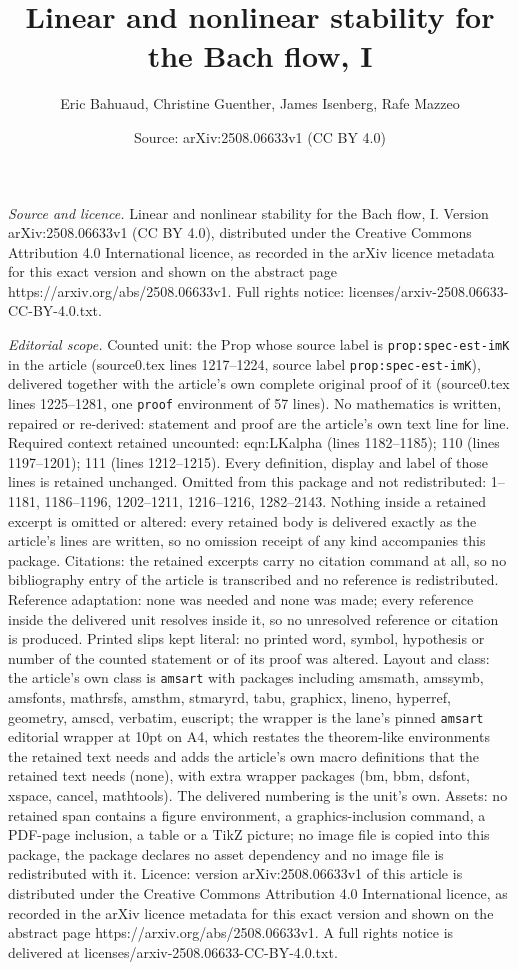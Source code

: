 \documentclass[10pt,a4paper]{amsart}
\title[Linear and nonlinear stability for the Bach flow, I]{Linear and nonlinear stability for the Bach flow, I}
\author{Eric Bahuaud, Christine Guenther, James Isenberg, Rafe Mazzeo}
\date{Source: arXiv:2508.06633v1 (CC BY 4.0)}
\begin{document}
\maketitle

\noindent\emph{Source and licence.} Linear and nonlinear stability for the Bach flow, I. Version arXiv:2508.06633v1 (CC BY 4.0), distributed under the Creative Commons Attribution 4.0 International licence, as recorded in the arXiv licence metadata for this exact version and shown on the abstract page https://arxiv.org/abs/2508.06633v1. Full rights notice: licenses/arxiv-2508.06633-CC-BY-4.0.txt.\par\smallskip

\noindent\textit{Editorial scope.} Counted unit: the Prop whose source label is \texttt{prop:spec-est-imK} in the article (source0.tex lines 1217--1224, source label \texttt{prop:spec-est-imK}), delivered together with the article's own complete original proof of it (source0.tex lines 1225--1281, one \texttt{proof} environment of 57 lines). No mathematics is written, repaired or re-derived: statement and proof are the article's own text line for line. Required context retained uncounted: eqn:LKalpha (lines 1182--1185); 110 (lines 1197--1201); 111 (lines 1212--1215). Every definition, display and label of those lines is retained unchanged. Omitted from this package and not redistributed: 1--1181, 1186--1196, 1202--1211, 1216--1216, 1282--2143. Nothing inside a retained excerpt is omitted or altered: every retained body is delivered exactly as the article's lines are written, so no omission receipt of any kind accompanies this package. Citations: the retained excerpts carry no citation command at all, so no bibliography entry of the article is transcribed and no reference is redistributed. Reference adaptation: none was needed and none was made; every reference inside the delivered unit resolves inside it, so no unresolved reference or citation is produced. Printed slips kept literal: no printed word, symbol, hypothesis or number of the counted statement or of its proof was altered. Layout and class: the article's own class is \texttt{amsart} with packages including amsmath, amssymb, amsfonts, mathrsfs, amsthm, stmaryrd, tabu, graphicx, lineno, hyperref, geometry, amscd, verbatim, euscript; the wrapper is the lane's pinned \texttt{amsart} editorial wrapper at 10pt on A4, which restates the theorem-like environments the retained text needs and adds the article's own macro definitions that the retained text needs (none), with extra wrapper packages (bm, bbm, dsfont, xspace, cancel, mathtools). The delivered numbering is the unit's own. Assets: no retained span contains a figure environment, a graphics-inclusion command, a PDF-page inclusion, a table or a TikZ picture; no image file is copied into this package, the package declares no asset dependency and no image file is redistributed with it. Licence: version arXiv:2508.06633v1 of this article is distributed under the Creative Commons Attribution 4.0 International licence, as recorded in the arXiv licence metadata for this exact version and shown on the abstract page https://arxiv.org/abs/2508.06633v1. A full rights notice is delivered at licenses/arxiv-2508.06633-CC-BY-4.0.txt. 
\end{document}
